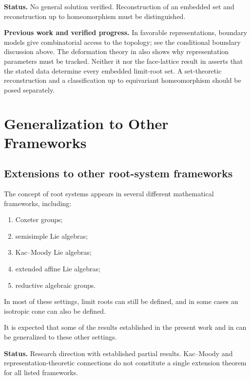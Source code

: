 \documentclass[11pt,reqno]{amsart}
\theoremstyle{plain}
\theoremstyle{definition}
\theoremstyle{remark}
\numberwithin{equation}{section}
\begin{document}
\par\medskip
\noindent\textbf{Status.} No general solution verified. Reconstruction of an embedded set and reconstruction up to homeomorphism must be distinguished.

\par\medskip
\noindent\textbf{Previous work and verified progress.}
In favorable representations, boundary models give combinatorial
access to the topology; see the conditional boundary discussion above.
The deformation theory in \cite[Section~8]{DGKLM2025} also shows why
representation parameters must be tracked. Neither it nor the face-lattice
result in \cite{Dyer2019} asserts that the stated data determine every
embedded limit-root set. A set-theoretic reconstruction and a classification
up to equivariant homeomorphism should be posed separately.

\section{Generalization to Other Frameworks}

\subsection{Extensions to other root-system frameworks}

The concept of root systems appears in several
different mathematical frameworks, including:
\begin{enumerate}
    \item Coxeter groups;
    \item semisimple Lie algebras;
    \item Kac--Moody Lie algebras;
    \item extended affine Lie algebras;
    \item reductive algebraic groups.
\end{enumerate}

In most of these settings, limit roots can still be
defined, and in some cases an isotropic cone can
also be defined.

It is expected that some of the results established
in the present work and in \cite{HLR} can be generalized
to these other settings.


\par\medskip
\noindent\textbf{Status.} Research direction with established partial results. Kac--Moody and representation-theoretic connections do not constitute a single extension theorem for all listed frameworks.
\end{document}
